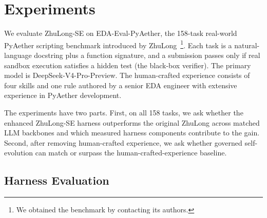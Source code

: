 \section{Experiments}
\label{sec:experiments}

We evaluate ZhuLong-SE on EDA-Eval-PyAether, the 158-task real-world PyAether scripting benchmark introduced by ZhuLong~\cite{liu2026zhulong}\footnote{We obtained the benchmark by contacting its authors.}. Each task is a natural-language docstring plus a function signature, and a submission passes only if real sandbox execution satisfies a hidden test (the black-box verifier). The primary model is DeepSeek-V4-Pro-Preview. The human-crafted experience consists of four skills and one rule authored by a senior EDA engineer with extensive experience in PyAether development.

The experiments have two parts. First, on all 158 tasks, we ask whether the enhanced ZhuLong-SE harness outperforms the original ZhuLong across matched LLM backbones and which measured harness components contribute to the gain. Second, after removing human-crafted experience, we ask whether governed self-evolution can match or surpass the human-crafted-experience baseline.

\subsection{Harness Evaluation}
\label{sec:exp_retrieval}

